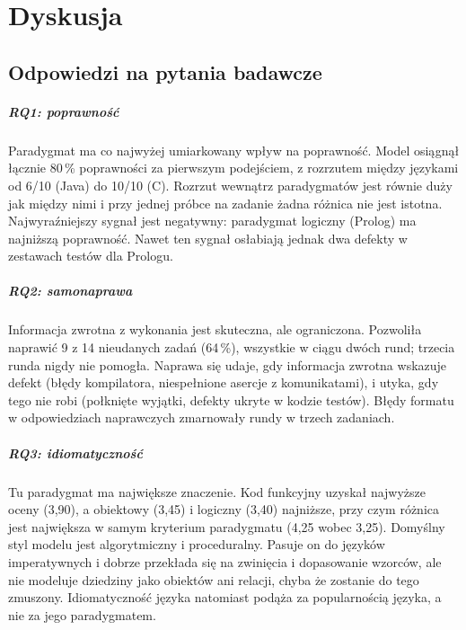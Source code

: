 \chapter{Dyskusja}
\label{ch:discussion}

\section{Odpowiedzi na pytania badawcze}
\label{sec:answers}

\paragraph{RQ1: poprawność} Paradygmat ma co najwyżej umiarkowany wpływ na poprawność. Model osiągnął
łącznie 80\,\% poprawności za pierwszym podejściem, z rozrzutem między językami od 6/10 (Java) do
10/10 (C). Rozrzut wewnątrz paradygmatów jest równie duży jak między nimi i przy jednej próbce na
zadanie żadna różnica nie jest istotna. Najwyraźniejszy sygnał jest negatywny: paradygmat logiczny
(Prolog) ma najniższą poprawność. Nawet ten sygnał osłabiają jednak dwa defekty w zestawach testów
dla Prologu.

\paragraph{RQ2: samonaprawa} Informacja zwrotna z wykonania jest skuteczna, ale ograniczona.
Pozwoliła naprawić 9 z 14 nieudanych zadań (64\,\%), wszystkie w ciągu dwóch rund; trzecia runda
nigdy nie pomogła. Naprawa się udaje, gdy informacja zwrotna wskazuje defekt (błędy kompilatora,
niespełnione asercje z komunikatami), i utyka, gdy tego nie robi (połknięte wyjątki, defekty ukryte
w kodzie testów). Błędy formatu w odpowiedziach naprawczych zmarnowały rundy w trzech zadaniach.

\paragraph{RQ3: idiomatyczność} Tu paradygmat ma największe znaczenie. Kod funkcyjny uzyskał
najwyższe oceny (3,90), a obiektowy (3,45) i logiczny (3,40) najniższe, przy czym różnica jest
największa w samym kryterium paradygmatu (4,25 wobec 3,25). Domyślny styl modelu jest algorytmiczny
i proceduralny. Pasuje on do języków imperatywnych i dobrze przekłada się na zwinięcia
i dopasowanie wzorców, ale nie modeluje dziedziny jako obiektów ani relacji, chyba że zostanie do
tego zmuszony. Idiomatyczność języka natomiast podąża za popularnością języka, a nie za jego
paradygmatem.


